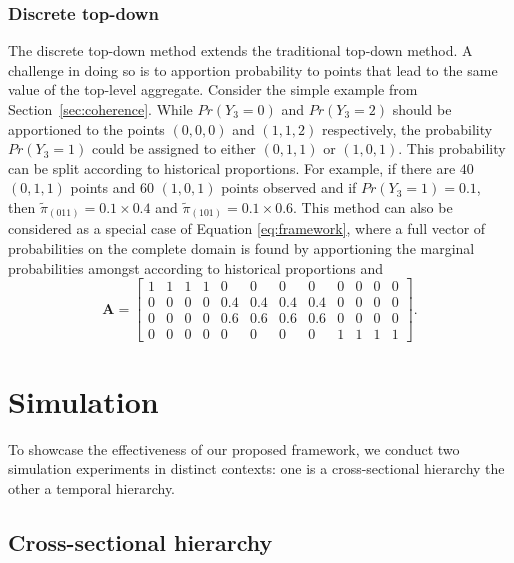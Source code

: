 \documentclass[a4paper,review,12pt,authoryear]{elsarticle}
\theoremstyle{definition}
\begin{document}
    \subsubsection*{\textbf{Discrete top-down}}

    The discrete top-down method extends the traditional top-down method. A challenge in doing so is to apportion probability to points that lead to the same value of the top-level aggregate. Consider the simple example from Section~\ref{sec:coherence}. While $Pr(Y_3=0)$ and $Pr(Y_3=2)$ should be apportioned to the points $(0,0,0)$ and $(1,1,2)$ respectively, the probability $Pr(Y_3=1)$ could be assigned to either $(0,1,1)$ or $(1,0,1)$. This probability can be split according to historical proportions. For example, if there are $40$ $(0, 1, 1)$ points and $60$ $(1, 0, 1) $ points observed and if  $Pr(Y_3=1) = 0.1$, then $\tilde \pi_{(011)} = 0.1\times 0.4$ and $\tilde \pi_{(101)} = 0.1\times 0.6$.
    This method can also be considered as a special case of Equation \eqref{eq:framework}, where a full vector of probabilities on the complete domain is found by apportioning the marginal probabilities amongst according to historical proportions and
    \[
    \mathbf{A} = \left[\begin{matrix}
      1 & 1 & 1 & 1 & 0 & 0 & 0 & 0 & 0 & 0 & 0 & 0 \\
      0 & 0 & 0 & 0 & 0.4 & 0.4 & 0.4 & 0.4 & 0 & 0 & 0 & 0 \\
      0 & 0 & 0 & 0 & 0.6 & 0.6 & 0.6 & 0.6 & 0 & 0 & 0 & 0 \\
      0 & 0 & 0 & 0 & 0 & 0 & 0 & 0 & 1 & 1 & 1 & 1
    \end{matrix}\right].
    \]

\section{Simulation}
\label{sec:simulation}

To showcase the effectiveness of our proposed framework, we conduct two simulation experiments in distinct contexts: one is a cross-sectional hierarchy the other a temporal hierarchy.

  \subsection{Cross-sectional hierarchy}
  \label{sec:cross-sectional_simu}
\end{document}
